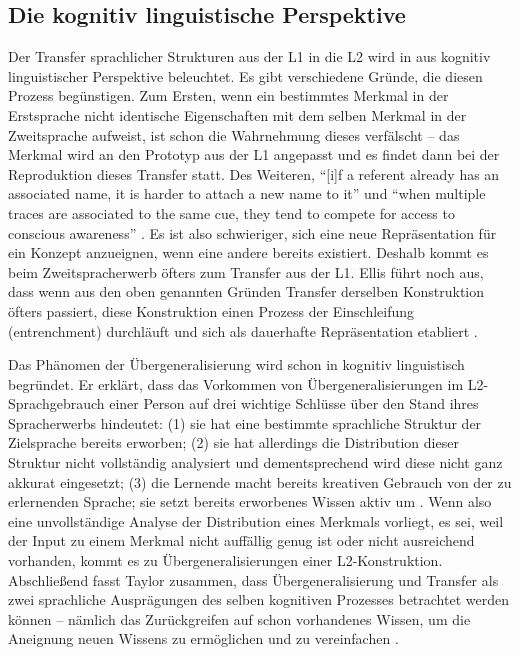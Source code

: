 \subsection{Die kognitiv linguistische Perspektive}
Der Transfer sprachlicher Strukturen aus der L1 in die L2 wird in \cite[][]{Ellis06} aus kognitiv linguistischer Perspektive beleuchtet.
Es gibt verschiedene Gründe, die diesen Prozess begünstigen.
Zum Ersten, wenn ein bestimmtes Merkmal in der Erstsprache nicht identische Eigenschaften mit dem selben Merkmal in der Zweitsprache aufweist, ist schon die Wahrnehmung dieses verfälscht --
das Merkmal wird an den Prototyp aus der L1 angepasst und es findet dann bei der Reproduktion dieses Transfer statt.
Des Weiteren, ``[i]f a referent already has an associated name, it is harder to attach a new name to it'' und
``when multiple traces are associated to the same cue, they tend to compete for access to conscious awareness'' \cite[S.174-176]{Ellis06}.
Es ist also schwieriger, sich eine neue Repräsentation für ein Konzept anzueignen, wenn eine andere bereits existiert.
Deshalb kommt es beim Zweitspracherwerb öfters zum Transfer aus der L1.
Ellis führt noch aus, dass wenn aus den oben genannten Gründen Transfer derselben Konstruktion öfters passiert, diese Konstruktion einen Prozess der Einschleifung (entrenchment) durchläuft und sich als dauerhafte Repräsentation etabliert \cite[][]{Ellis06}.

Das Phänomen der Übergeneralisierung wird schon in \cite[][]{Taylor75} kognitiv linguistisch begründet.
Er erklärt, dass das Vorkommen von Übergeneralisierungen im L2-Sprachgebrauch einer Person auf drei wichtige Schlüsse über den Stand ihres Spracherwerbs hindeutet:
(1) sie hat eine bestimmte sprachliche Struktur der Zielsprache bereits erworben;
(2) sie hat allerdings die Distribution dieser Struktur nicht vollständig analysiert und dementsprechend wird diese nicht ganz akkurat eingesetzt;
(3) die Lernende macht bereits kreativen Gebrauch von der zu erlernenden Sprache; sie setzt bereits erworbenes Wissen aktiv um \cite[vgl.][S.74]{Taylor75}.
Wenn also eine unvollständige Analyse der Distribution eines Merkmals vorliegt, es sei, weil der Input zu einem Merkmal nicht auffällig genug ist oder nicht ausreichend vorhanden, kommt es zu Übergeneralisierungen einer L2-Konstruktion.
Abschließend fasst Taylor zusammen, dass Übergeneralisierung und Transfer als zwei sprachliche Ausprägungen des selben kognitiven Prozesses betrachtet werden können --
nämlich das Zurückgreifen auf schon vorhandenes Wissen, um die Aneignung neuen Wissens zu ermöglichen und zu vereinfachen \cite[vgl.][S.87]{Taylor75}.



